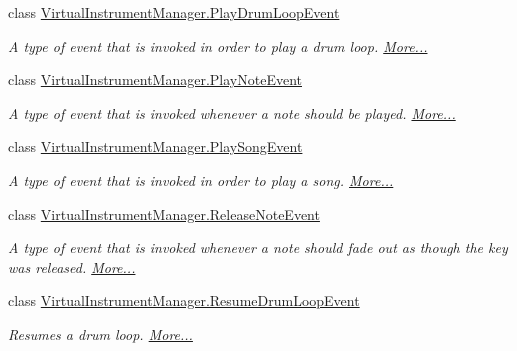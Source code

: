 \begin{DoxyCompactItemize}
class \hyperlink{group___v_i_m_event_types_class_virtual_instrument_manager_1_1_play_drum_loop_event}{Virtual\+Instrument\+Manager.\+Play\+Drum\+Loop\+Event}
\begin{DoxyCompactList}\small\item\em A type of event that is invoked in order to play a drum loop.  \hyperlink{group___v_i_m_event_types_class_virtual_instrument_manager_1_1_play_drum_loop_event}{More...}\end{DoxyCompactList}\item 
class \hyperlink{group___v_i_m_event_types_class_virtual_instrument_manager_1_1_play_note_event}{Virtual\+Instrument\+Manager.\+Play\+Note\+Event}
\begin{DoxyCompactList}\small\item\em A type of event that is invoked whenever a note should be played.  \hyperlink{group___v_i_m_event_types_class_virtual_instrument_manager_1_1_play_note_event}{More...}\end{DoxyCompactList}\item 
class \hyperlink{group___v_i_m_event_types_class_virtual_instrument_manager_1_1_play_song_event}{Virtual\+Instrument\+Manager.\+Play\+Song\+Event}
\begin{DoxyCompactList}\small\item\em A type of event that is invoked in order to play a song.  \hyperlink{group___v_i_m_event_types_class_virtual_instrument_manager_1_1_play_song_event}{More...}\end{DoxyCompactList}\item 
class \hyperlink{group___v_i_m_event_types_class_virtual_instrument_manager_1_1_release_note_event}{Virtual\+Instrument\+Manager.\+Release\+Note\+Event}
\begin{DoxyCompactList}\small\item\em A type of event that is invoked whenever a note should fade out as though the key was released.  \hyperlink{group___v_i_m_event_types_class_virtual_instrument_manager_1_1_release_note_event}{More...}\end{DoxyCompactList}\item 
class \hyperlink{group___v_i_m_event_types_class_virtual_instrument_manager_1_1_resume_drum_loop_event}{Virtual\+Instrument\+Manager.\+Resume\+Drum\+Loop\+Event}
\begin{DoxyCompactList}\small\item\em Resumes a drum loop.  \hyperlink{group___v_i_m_event_types_class_virtual_instrument_manager_1_1_resume_drum_loop_event}{More...}\end{DoxyCompactList}\item 

\end{DoxyCompactItemize}
